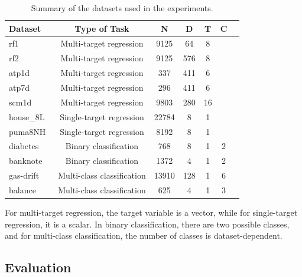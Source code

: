 \documentclass[3p,review,authoryear]{elsarticle}
\begin{document}
\begin{table}[h!]
\centering
\caption{Summary of the datasets used in the experiments.}
\label{tab:datasets}
\begin{tabular}{@{}lcccccc@{}}
\toprule
\textbf{Dataset} & \textbf{Type of Task}          & \textbf{N} & \textbf{D} & \textbf{T} & \textbf{C} \\ \midrule
rf1~\citep{mulan}             & Multi-target regression        & 9125         & 64         & 8         &        \\
rf2~\citep{mulan}             & Multi-target regression        & 9125         & 576         & 8         &        \\
atp1d~\citep{mulan}           & Multi-target regression        & 337         & 411         & 6         &        \\
atp7d~\citep{mulan}           & Multi-target regression        & 296         & 411         & 6         &        \\
scm1d~\citep{mulan}           & Multi-target regression        & 9803         & 280         & 16         &        \\
house\_8L~\citep{openml}       & Single-target regression       &  22784        & 8         & 1          &        \\
puma8NH~\citep{openml}         & Single-target regression       & 8192         & 8         & 1          &        \\
diabetes~\citep{openml}        & Binary classification          & 768         & 8         & 1          & 2          \\
banknote~\citep{openml} & Binary classification          & 1372         & 4         & 1          & 2          \\
gas-drift~\citep{openml}  & Multi-class classification     & 13910         & 128         & 1          & 6         \\
balance~\citep{openml}         & Multi-class classification     & 625         & 4         & 1          & 3         \\ \bottomrule
\end{tabular}
\end{table}

For multi-target regression, the target variable is a vector, while for single-target regression, it is a scalar.
In binary classification, there are two possible classes, and for multi-class classification, the number of classes is dataset-dependent.

\subsection{Evaluation}
\end{document}
